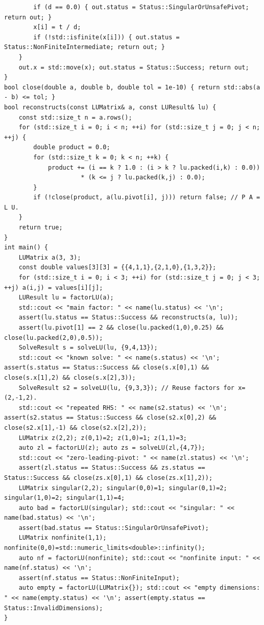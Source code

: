 \begin{verbatim}
        if (d == 0.0) { out.status = Status::SingularOrUnsafePivot; return out; }
        x[i] = t / d;
        if (!std::isfinite(x[i])) { out.status = Status::NonFiniteIntermediate; return out; }
    }
    out.x = std::move(x); out.status = Status::Success; return out;
}
bool close(double a, double b, double tol = 1e-10) { return std::abs(a - b) <= tol; }
bool reconstructs(const LUMatrix& a, const LUResult& lu) {
    const std::size_t n = a.rows();
    for (std::size_t i = 0; i < n; ++i) for (std::size_t j = 0; j < n; ++j) {
        double product = 0.0;
        for (std::size_t k = 0; k < n; ++k) {
            product += (i == k ? 1.0 : (i > k ? lu.packed(i,k) : 0.0))
                     * (k <= j ? lu.packed(k,j) : 0.0);
        }
        if (!close(product, a(lu.pivot[i], j))) return false; // P A = L U.
    }
    return true;
}
int main() {
    LUMatrix a(3, 3);
    const double values[3][3] = {{4,1,1},{2,1,0},{1,3,2}};
    for (std::size_t i = 0; i < 3; ++i) for (std::size_t j = 0; j < 3; ++j) a(i,j) = values[i][j];
    LUResult lu = factorLU(a);
    std::cout << "main factor: " << name(lu.status) << '\n';
    assert(lu.status == Status::Success && reconstructs(a, lu));
    assert(lu.pivot[1] == 2 && close(lu.packed(1,0),0.25) && close(lu.packed(2,0),0.5));
    SolveResult s = solveLU(lu, {9,4,13});
    std::cout << "known solve: " << name(s.status) << '\n'; assert(s.status == Status::Success && close(s.x[0],1) && close(s.x[1],2) && close(s.x[2],3));
    SolveResult s2 = solveLU(lu, {9,3,3}); // Reuse factors for x=(2,-1,2).
    std::cout << "repeated RHS: " << name(s2.status) << '\n'; assert(s2.status == Status::Success && close(s2.x[0],2) && close(s2.x[1],-1) && close(s2.x[2],2));
    LUMatrix z(2,2); z(0,1)=2; z(1,0)=1; z(1,1)=3;
    auto zl = factorLU(z); auto zs = solveLU(zl,{4,7});
    std::cout << "zero-leading-pivot: " << name(zl.status) << '\n';
    assert(zl.status == Status::Success && zs.status == Status::Success && close(zs.x[0],1) && close(zs.x[1],2));
    LUMatrix singular(2,2); singular(0,0)=1; singular(0,1)=2; singular(1,0)=2; singular(1,1)=4;
    auto bad = factorLU(singular); std::cout << "singular: " << name(bad.status) << '\n';
    assert(bad.status == Status::SingularOrUnsafePivot);
    LUMatrix nonfinite(1,1); nonfinite(0,0)=std::numeric_limits<double>::infinity();
    auto nf = factorLU(nonfinite); std::cout << "nonfinite input: " << name(nf.status) << '\n';
    assert(nf.status == Status::NonFiniteInput);
    auto empty = factorLU(LUMatrix{}); std::cout << "empty dimensions: " << name(empty.status) << '\n'; assert(empty.status == Status::InvalidDimensions);
}
\end{verbatim}

